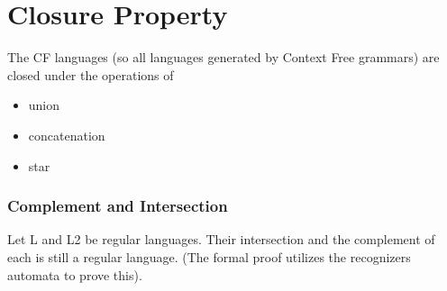 	\section{Closure Property}
		The CF languages (so all languages generated by Context Free grammars) are closed under the operations of
		\begin{itemize}
			\item union
			\item concatenation
			\item star
		\end{itemize}
		
		\subsubsection{Complement and Intersection}
			Let L and L2 be regular languages. Their intersection and the complement of each is still a regular language. (The formal proof utilizes the 
			recognizers automata to prove this).
		
